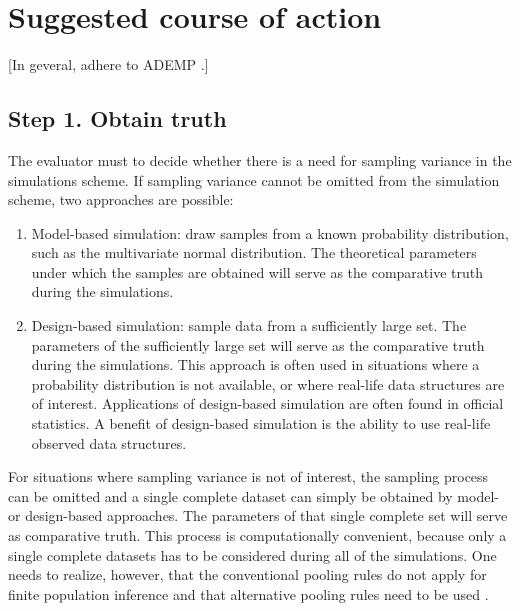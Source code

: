 \documentclass[bimj,fleqn]{w-art}
\theoremstyle{plain}
\theoremstyle{definition}
\begin{document}

\section{Suggested course of action}

[In geveral, adhere to ADEMP \citep{morr18}.]


\subsection{Step 1. Obtain truth}

The evaluator must to decide whether there is a need for sampling variance in the simulations scheme. If sampling variance cannot be omitted from the simulation scheme, two approaches are possible:
\begin{enumerate}
  \item Model-based simulation: draw samples from a known probability distribution, such as the multivariate normal distribution. The theoretical parameters under which the samples are obtained will serve as the comparative truth during the simulations. 
  \item Design-based simulation: sample data from a sufficiently large set. The parameters of the sufficiently large set will serve as the comparative truth during the simulations. This approach is often used in situations where a probability distribution is not available, or where real-life data structures are of interest. Applications of design-based simulation are often found in official statistics. A benefit of design-based simulation is the ability to use real-life observed data structures. 
\end{enumerate}
For situations where sampling variance is not of interest, the sampling process can be omitted and a single complete dataset can simply be obtained by model- or design-based approaches. The parameters of that single complete set will serve as comparative truth. This process is computationally convenient, because only a single complete datasets has to be considered during all of the simulations. One needs to realize, however, that the conventional pooling rules \citep[cf.][p. 76-77]{rubi87} do not apply for finite population inference and that alternative pooling rules need to be used \citep{raghunathan2003multiple,vink14}. 


\end{document}
